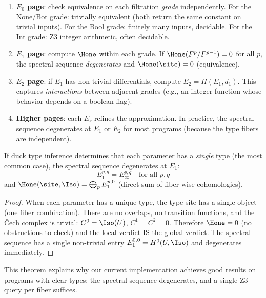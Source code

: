 \begin{enumerate}
  \item \textbf{$E_0$ page}: check equivalence on each filtration
    \emph{grade} independently.  For the None/Bot grade: trivially
    equivalent (both return the same constant on trivial inputs).
    For the Bool grade: finitely many inputs, decidable.
    For the Int grade: Z3 integer arithmetic, often decidable.

  \item \textbf{$E_1$ page}: compute $\Hone$ within each grade.
    If $\Hone(F^p / F^{p-1}) = 0$ for all $p$, the spectral
    sequence \emph{degenerates} and $\Hone(\site) = 0$ (equivalence).

  \item \textbf{$E_2$ page}: if $E_1$ has non-trivial differentials,
    compute $E_2 = H(E_1, d_1)$.  This captures \emph{interactions}
    between adjacent grades (e.g., an integer function whose behavior
    depends on a boolean flag).

  \item \textbf{Higher pages}: each $E_r$ refines the approximation.
    In practice, the spectral sequence degenerates at $E_1$ or $E_2$
    for most programs (because the type fibers are independent).
\end{enumerate}

\begin{theorem}
\label{thm:degeneration}
If duck type inference determines that each parameter has a
\emph{single} type (the most common case), the spectral sequence
degenerates at $E_1$:
\[
  E_1^{p,q} = E_\infty^{p,q} \quad \text{for all $p, q$}
\]
and $\Hone(\site, \Iso) = \bigoplus_p E_1^{p,0}$ (direct sum of
fiber-wise cohomologies).
\end{theorem}

\begin{proof}
When each parameter has a unique type, the type site has a single
object (one fiber combination).  There are no overlaps, no transition
functions, and the \v{C}ech complex is trivial: $C^0 = \Iso(U)$,
$C^1 = C^2 = 0$.  Therefore $\Hone = 0$ (no obstructions to check)
and the local verdict IS the global verdict.  The spectral sequence
has a single non-trivial entry $E_1^{0,0} = H^0(U, \Iso)$ and
degenerates immediately.
\end{proof}

This theorem explains why our current implementation achieves good
results on programs with clear types: the spectral sequence
degenerates, and a single Z3 query per fiber suffices.

